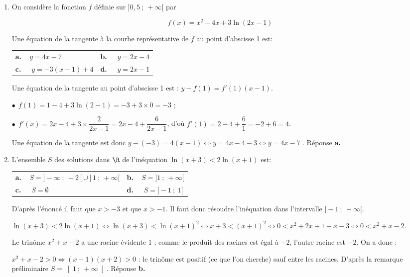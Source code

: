 \begin{enumerate}
Le trinôme $x^2 +x - 6$ a une racine évidente : 2. Le produit des racines étant égal à $- 6$, l'autre racine est donc $- 3$.

Donc $x^2 + x - 6 = (x - 2)(x + 3)$. On sait que ce trinôme est positif sauf (ce que l'on cherche) entre les racines $- 3$ et 2.

La fonction est donc définie sur l'intervalle $]-3~;~2[$. Réponse \textbf{a.}

\item On considère la fonction $f$ définie sur $]0,5~;~+ \infty [$ par 

\[f(x) =x^2- 4x+ 3 \ln (2x - 1)\]

Une équation de la tangente à la courbe représentative de $f$ au point d'abscisse 1 est:

\begin{center}
\begin{tabularx}{\linewidth}{*{2}{X}}
\textbf{a.~~}$y = 4x- 7$ &\textbf{b.~~} $y = 2x - 4$\\
\textbf{c.~~} $y = -3(x - 1) + 4$ &\textbf{d.~~} $y = 2x - 1$
\end{tabularx}
\end{center}
Une équation de la tangente au point d'abscisse 1 est : $y - f(1) = f'(1)(x - 1)$.

$\bullet~~$$f(1) = 1 - 4 + 3\ln (2 - 1) = - 3 + 3 \times 0 = - 3$ ;

$\bullet~~$$f'(x) = 2x - 4 + 3 \times \dfrac{2}{2x - 1} = 2x - 4 + \dfrac{6}{2x - 1}$, d'où $f'(1) = 2 - 4 + \dfrac{6}{1} = - 2 + 6 = 4$.

Une équation de la tangente est donc $y - (- 3) = 4(x - 1) \iff y = 4x - 4 - 3\iff y = 4x - 7$ . Réponse \textbf{a.}

\item L'ensemble $S$ des solutions dans $\R$ de l'inéquation $\ln (x + 3) < 2\ln (x + 1)$ est:

\begin{center}
\begin{tabularx}{\linewidth}{*{2}{X}}
\textbf{a.~~}$S = ]- \infty~;~-2[ \cup ]1~;~+\infty[$&\textbf{b.~~}$S = ]1~;~+ \infty[$\\
\textbf{c.~~} $S = \emptyset$&\textbf{d.~~} $S = ]- 1~;~1[$
\end{tabularx}
\end{center}
D'après l'énoncé il faut que $x > -3$ et que $x > - 1$. Il faut donc résoudre l'inéquation dans l'intervalle $]- 1~;~+ \infty[$.

$\ln (x + 3) < 2\ln (x + 1) \iff \ln (x + 3) < \ln (x + 1)^2 \iff x + 3 <  (x + 1)^2  \iff  0 < x^2 + 2x + 1 - x - 3 \iff 0< x^2 + x - 2$.

Le trinôme $x^2 + x - 2$ a une racine évidente 1 ; comme le produit des racines est égal à $- 2$, l'autre racine est $- 2$. On a donc :

$x^2 + x - 2  > 0 \iff (x - 1)(x + 2)> 0$ : le trinôme est positif (ce que l'on cherche) sauf entre les racines. D'après la remarque préliminaire  $S = \left]1~;~+ \infty\right[$. Réponse \textbf{b.}
\end{enumerate}

\bigskip
